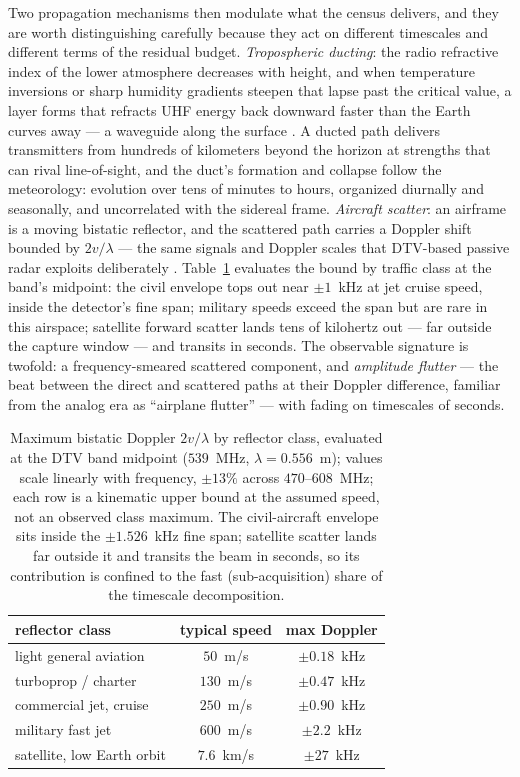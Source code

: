 Two propagation mechanisms then modulate what the census delivers, and they are worth distinguishing carefully because they act on different timescales and different terms of the residual budget. \emph{Tropospheric ducting}: the radio refractive index of the lower atmosphere decreases with height, and when temperature inversions or sharp humidity gradients steepen that lapse past the critical value, a layer forms that refracts UHF energy back downward faster than the Earth curves away --- a waveguide along the surface \cite{itup453}. A ducted path delivers transmitters from hundreds of kilometers beyond the horizon at strengths that can rival line-of-sight, and the duct's formation and collapse follow the meteorology: evolution over tens of minutes to hours, organized diurnally and seasonally, and uncorrelated with the sidereal frame. \emph{Aircraft scatter}: an airframe is a moving bistatic reflector, and the scattered path carries a Doppler shift bounded by $2v/\lambda$ --- the same signals and Doppler scales that DTV-based passive radar exploits deliberately \cite{griffiths2017passive}. Table~\ref{tab:doppler} evaluates the bound by traffic class at the band's midpoint: the civil envelope tops out near $\pm 1$~kHz at jet cruise speed, inside the detector's fine span; military speeds exceed the span but are rare in this airspace; satellite forward scatter lands tens of kilohertz out --- far outside the capture window --- and transits in seconds. The observable signature is twofold: a frequency-smeared scattered component, and \emph{amplitude flutter} --- the beat between the direct and scattered paths at their Doppler difference, familiar from the analog era as ``airplane flutter'' --- with fading on timescales of seconds.

\begin{table}[H]
\centering
\caption[Maximum bistatic Doppler by reflector class]{Maximum bistatic Doppler $2v/\lambda$ by reflector class, evaluated at the DTV band midpoint ($539$~MHz, $\lambda = 0.556$~m); values scale linearly with frequency, $\pm 13\%$ across $470$--$608$~MHz; each row is a kinematic upper bound at the assumed speed, not an observed class maximum. The civil-aircraft envelope sits inside the $\pm 1.526$~kHz fine span; satellite scatter lands far outside it and transits the beam in seconds, so its contribution is confined to the fast (sub-acquisition) share of the timescale decomposition.}
\label{tab:doppler}
\begin{tabular}{lcc}
\toprule
reflector class & typical speed & max Doppler \\
\midrule
light general aviation & $50$~m/s & $\pm 0.18$~kHz \\
turboprop / charter & $130$~m/s & $\pm 0.47$~kHz \\
commercial jet, cruise & $250$~m/s & $\pm 0.90$~kHz \\
military fast jet & $600$~m/s & $\pm 2.2$~kHz \\
satellite, low Earth orbit & $7.6$~km/s & $\pm 27$~kHz \\
\bottomrule
\end{tabular}
\end{table}


